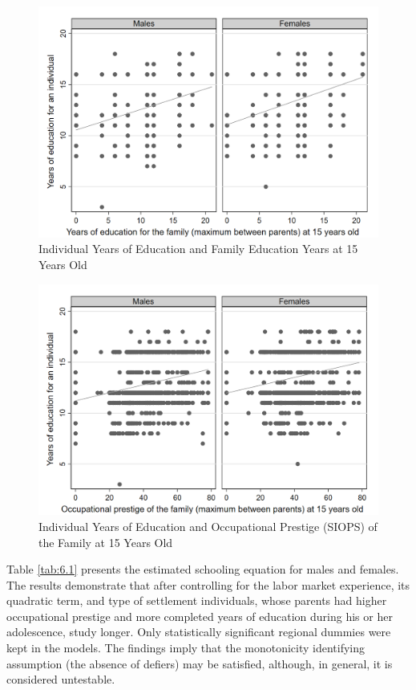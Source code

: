 \documentclass[alpha-refs]{wiley-article-01g}
\begin{document}
\begin{figure}[h!]
	\centering
	\includegraphics[width=\textwidth]{fam_edu_schooling.png}
	\caption{Individual Years of Education and Family Education Years at 15 Years Old}\label{fig:6.1}
\end{figure}

\begin{figure}[h!]
	\centering
	\includegraphics[width=\textwidth]{fam_prestige_schooling.png}
	\caption{Individual Years of Education and Occupational Prestige (SIOPS) of the Family at 15 Years Old}\label{fig:6.2}
\end{figure}

Table \ref{tab:6.1} presents the estimated schooling equation for males and females. The results demonstrate that after controlling for the labor market experience, its quadratic term, and type of settlement individuals, whose parents had higher occupational prestige and more completed years of education during his or her adolescence, study longer. Only statistically significant regional dummies were kept in the models. The findings imply that the monotonicity identifying assumption (the absence of defiers) may be satisfied, although, in general, it is considered untestable.
\end{document}
